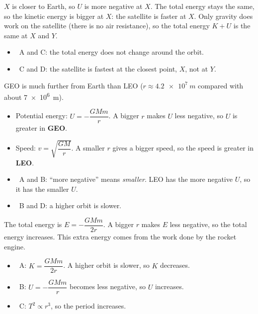 \begin{practiceanswers}
\begin{practiceans}
  $X$ is closer to Earth, so $U$ is more negative at $X$. The total energy stays the same, so the
  kinetic energy is bigger at $X$: the satellite is faster at $X$. Only gravity does work on the
  satellite (there is no air resistance), so the total energy $K + U$ is the same at $X$ and $Y$.
  \begin{itemize}
    \item \xmark\ A and C: the total energy does not change around the orbit.
    \item \xmark\ C and D: the satellite is fastest at the closest point, $X$, not at $Y$.
  \end{itemize}
\end{practiceans}

\begin{practiceans}
  GEO is much further from Earth than LEO ($r \approx \qty{4.2e7}{m}$ compared with about
  \qty{7e6}{m}).
  \begin{itemize}
    \item Potential energy: $U = -\dfrac{GMm}{r}$. A bigger $r$ makes $U$ less negative, so $U$ is
          greater in \textbf{GEO}.
    \item Speed: $v = \sqrt{\dfrac{GM}{r}}$. A smaller $r$ gives a bigger speed, so the speed is
          greater in \textbf{LEO}.
  \end{itemize}
  \begin{itemize}
    \item \xmark\ A and B: “more negative” means \emph{smaller}. LEO has the more negative
          $U$, so it has the smaller $U$.
    \item \xmark\ B and D: a higher orbit is slower.
  \end{itemize}
\end{practiceans}

\begin{practiceans}
  The total energy is $E = -\dfrac{GMm}{2r}$. A bigger $r$ makes $E$ less negative, so the total
  energy increases. This extra energy comes from the work done by the rocket engine.
  \begin{itemize}
    \item \xmark\ A: $K = \dfrac{GMm}{2r}$. A higher orbit is slower, so $K$ decreases.
    \item \xmark\ B: $U = -\dfrac{GMm}{r}$ becomes less negative, so $U$ increases.
    \item \xmark\ C: $T^2 \propto r^3$, so the period increases.
  \end{itemize}
\end{practiceans}


\end{practiceanswers}
